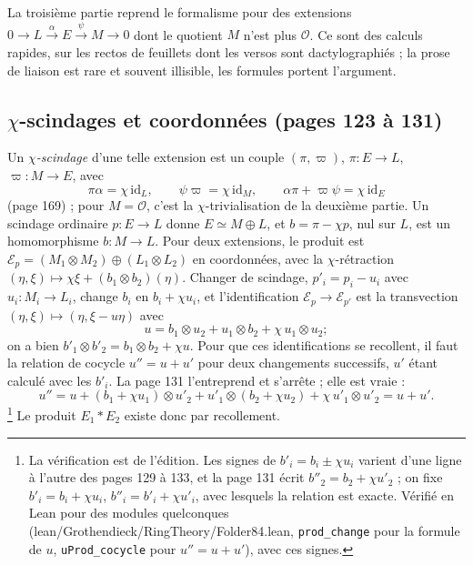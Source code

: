 \documentclass[11pt,a4paper]{article}
\begin{document}
La troisième partie reprend le formalisme pour des extensions
$0 \to L \xrightarrow{\alpha} E \xrightarrow{\psi} M \to 0$ dont le quotient $M$ n'est
plus $\mathcal{O}$. Ce sont des calculs rapides, sur les rectos de feuillets dont les
versos sont dactylographiés ; la prose de liaison est rare et souvent illisible,
les formules portent l'argument.

\subsection*{$\chi$-scindages et coordonnées (pages 123 à 131)}

Un \emph{$\chi$-scindage} d'une telle extension est un couple $(\pi, \varpi)$,
$\pi : E \to L$, $\varpi : M \to E$, avec
\[
  \pi\alpha = \chi\,\mathrm{id}_L, \qquad \psi\varpi = \chi\,\mathrm{id}_M, \qquad
  \alpha\pi + \varpi\psi = \chi\,\mathrm{id}_E
\]
(page 169) ; pour $M = \mathcal{O}$, c'est la $\chi$-trivialisation de la deuxième
partie. Un scindage ordinaire $p : E \to L$ donne $E \simeq M \oplus L$, et
$b = \pi - \chi p$, nul sur $L$, est un homomorphisme $b : M \to L$. Pour deux
extensions, le produit est $\mathcal{E}_p = (M_1 \otimes M_2) \oplus (L_1 \otimes L_2)$ en
coordonnées, avec la $\chi$-rétraction $(\eta, \xi) \mapsto \chi\xi + (b_1 \otimes b_2)(\eta)$.
Changer de scindage, $p'_i = p_i - u_i$ avec $u_i : M_i \to L_i$, change $b_i$ en
$b_i + \chi u_i$, et l'identification $\mathcal{E}_p \to \mathcal{E}_{p'}$ est la
transvection $(\eta, \xi) \mapsto (\eta, \xi - u\eta)$ avec
\[
  u = b_1 \otimes u_2 + u_1 \otimes b_2 + \chi\, u_1 \otimes u_2 ;
\]
on a bien $b'_1 \otimes b'_2 = b_1 \otimes b_2 + \chi u$. Pour que ces identifications se
recollent, il faut la relation de cocycle $u'' = u + u'$ pour deux changements
successifs, $u'$ étant calculé avec les $b'_i$. La page 131 l'entreprend et
s'arrête ; elle est vraie :
\[
  u'' = u + (b_1 + \chi u_1) \otimes u'_2 + u'_1 \otimes (b_2 + \chi u_2) + \chi\, u'_1 \otimes u'_2 = u + u'.
\]\footnote{La
  vérification est de l'édition. Les signes de $b'_i = b_i \pm \chi u_i$ varient d'une
  ligne à l'autre des pages 129 à 133, et la page 131 écrit $b''_2 = b_2 + \chi u'_2$ ;
  on fixe $b'_i = b_i + \chi u_i$, $b''_i = b'_i + \chi u'_i$, avec lesquels la relation
  est exacte. Vérifié en Lean pour des modules quelconques
  (lean/Grothendieck/RingTheory/Folder84.lean, \texttt{prod\_change} pour la formule de $u$,
  \texttt{uProd\_cocycle} pour $u'' = u + u'$), avec ces signes.}
Le produit $E_1 * E_2$ existe donc par recollement.
\end{document}
